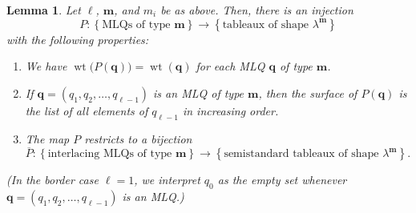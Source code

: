 \documentclass[reqno]{amsart}
\newcommand{\0}{\phantom{c}}
\DeclareMathOperator{\wt}{wt} %
\newcommand{\mm}{\mathbf{m}}
\newcommand{\qq}{\mathbf{q}}
\newcommand{\set}[1]{\left\{ #1 \right\}}
\newcommand{\tup}[1]{\left( #1 \right)}
\theoremstyle{plain}
\newtheorem{lemma}[thm]{Lemma}
\theoremstyle{definition}
\numberwithin{equation}{section}
\begin{document}
\begin{lemma}
\label{lem:determinant_form.bij1}
Let $\ell$, $\mm$, and $m_i$ be as above.
Then, there is an injection
\[
P \colon \set{ \text{MLQs of type } \mm } \to \set{ \text{tableaux of shape } \lambda^{\mm} }
\]
with the following properties:
\begin{enumerate}
\item[(a)] We have $\wt\bigl(  P(\qq) \bigr) = \wt(\qq)$ for each MLQ $\qq$ of type $\mm$.

\item[(b)] If $\qq = \tup{q_1, q_2, \dotsc, q_{\ell-1}}$ is an MLQ of type $\mm$, then the surface of $P(\qq)$ is the list of all elements of $q_{\ell-1}$ in increasing order.

\item[(c)] The map $P$ restricts to a bijection
\[
\overline{P} \colon \set{\text{interlacing MLQs of type } \mm}  \to \set{  \text{semistandard tableaux of shape } \lambda^{\mm}}.
\]
\end{enumerate}
(In the border case $\ell = 1$, we interpret $q_0$ as the empty set whenever $\qq = \tup{q_1, q_2, \dotsc, q_{\ell-1}}$ is an MLQ.)
\end{lemma}
\end{document}
